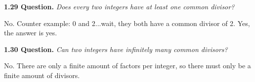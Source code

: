 \documentclass[12pt]{article}
\begin{document}
\noindent\textbf{1.29 Question.} \textit{Does every two integers have at least one common divisor?}

No. Counter example: 0 and 2...wait, they both have a common divisor of 2. Yes, the answer is yes.

\bigskip

\noindent\textbf{1.30 Question.} \textit{Can two integers have infinitely many common divisors?}

No. There are only a finite amount of factors per integer, so there must only be a finite amount of divisors.
\end{document}
